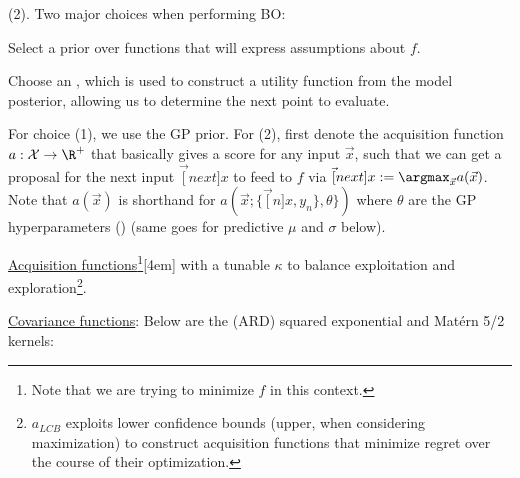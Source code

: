 \documentclass[11pt]{article}
\begin{document}
 (2). Two major choices when performing BO:
\begin{compactenum}
	\item Select a prior over functions that will express assumptions about $f$. 
	\item Choose an , which is used to construct a utility function from the model posterior, allowing us to determine the next point to evaluate. 
\end{compactenum}
For choice (1), we use the GP prior. For (2), first denote the acquisition function $a : \mathcal X \rightarrow \R^+$ that basically gives a score for any input $\vec x$, such that we can get a proposal for the next input $\vec[next]{x}$ to feed to $f$ via $\vec[next]{x} := \argmax_{\vec x} a(\vec x)$. Note that $a(\vec x)$ is shorthand for $a(\vec x; \{\vec[n]{x}, y_n\}, \theta\})$ where $\theta$ are the GP hyperparameters () (same goes for predictive $\mu$ and $\sigma$ below). 


\underline{Acquisition functions}\footnote{Note that we are trying to minimize $f$ in this context.}[4em]
with a tunable $\kappa$ to balance exploitation and exploration\footnote{$a_{LCB}$ exploits lower confidence bounds (upper, when considering maximization) to construct acquisition functions that minimize regret over the course of their optimization.}.

\underline{Covariance functions}: Below are the  (ARD) squared exponential and Mat\'{e}rn 5/2 kernels:
\end{document}
